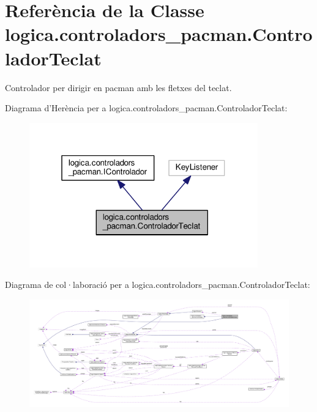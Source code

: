\hypertarget{classlogica_1_1controladors__pacman_1_1_controlador_teclat}{\section{Referència de la Classe logica.\+controladors\+\_\+pacman.\+Controlador\+Teclat}
\label{classlogica_1_1controladors__pacman_1_1_controlador_teclat}
}


Controlador per dirigir en pacman amb les fletxes del teclat.  




Diagrama d'Herència per a logica.\+controladors\+\_\+pacman.\+Controlador\+Teclat\+:
\nopagebreak
\begin{figure}[H]
\begin{center}
\leavevmode
\includegraphics[width=280pt]{classlogica_1_1controladors__pacman_1_1_controlador_teclat__inherit__graph}
\end{center}
\end{figure}


Diagrama de col·laboració per a logica.\+controladors\+\_\+pacman.\+Controlador\+Teclat\+:
\nopagebreak
\begin{figure}[H]
\begin{center}
\leavevmode
\includegraphics[width=350pt]{classlogica_1_1controladors__pacman_1_1_controlador_teclat__coll__graph}
\end{center}
\end{figure}
